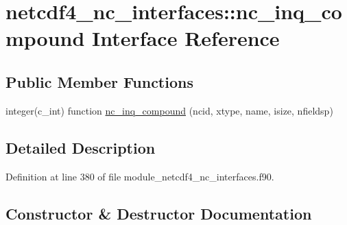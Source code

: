 \hypertarget{interfacenetcdf4__nc__interfaces_1_1nc__inq__compound}{}\section{netcdf4\+\_\+nc\+\_\+interfaces\+:\+:nc\+\_\+inq\+\_\+compound Interface Reference}
\label{interfacenetcdf4__nc__interfaces_1_1nc__inq__compound}
\subsection*{Public Member Functions}
\begin{DoxyCompactItemize}
\item 
integer(c\+\_\+int) function \hyperlink{interfacenetcdf4__nc__interfaces_1_1nc__inq__compound_a231293d78ae0caa0cbe4955ea69b8b3f}{nc\+\_\+inq\+\_\+compound} (ncid, xtype, name, isize, nfieldsp)
\end{DoxyCompactItemize}


\subsection{Detailed Description}


Definition at line 380 of file module\+\_\+netcdf4\+\_\+nc\+\_\+interfaces.\+f90.



\subsection{Constructor \& Destructor Documentation}
\mbox{\label{interfacenetcdf4__nc__interfaces_1_1nc__inq__compound_a231293d78ae0caa0cbe4955ea69b8b3f}} 
